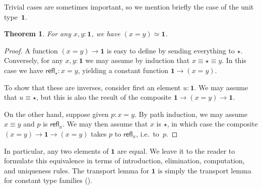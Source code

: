 \documentclass[12pt]{article}
\newcommand{\eqv}[2]{\ensuremath{#1 \simeq #2}\xspace}
\newcommand{\jdeq}{\equiv}
\newcommand{\refl}[1]{\ensuremath{\mathsf{refl}_{#1}}\xspace}
\newcommand{\ttt}{\ensuremath{\star}\xspace}
\newcommand{\unit}{\ensuremath{\mathbf{1}}\xspace}
\newtheorem{thm}{Theorem}[section]
\begin{document}
%
Trivial cases are sometimes important, so we mention briefly the case of the unit type~\unit.

\begin{thm}\label{thm:path-unit}
  For any $x,y:\unit$, we have $\eqv{(x=y)}{\unit}$.
\end{thm}
\begin{proof}
  A function $(x=y)\to\unit$ is easy to define by sending everything to \ttt.
  Conversely, for any $x,y:\unit$ we may assume by induction that $x\jdeq \ttt\jdeq y$.
  In this case we have $\refl{\ttt}:x=y$, yielding a constant function $\unit\to(x=y)$.

  To show that these are inverses, consider first an element $u:\unit$.
  We may assume that $u\jdeq\ttt$, but this is also the result of the composite $\unit \to (x=y)\to\unit$.

  On the other hand, suppose given $p:x=y$.
  By path induction, we may assume $x\jdeq y$ and $p$ is $\refl x$.
  We may then assume that $x$ is \ttt, in which case the composite $(x=y) \to \unit\to(x=y)$ takes $p$ to $\refl x$, i.e.\ to~$p$.
\end{proof}

In particular, any two elements of $\unit$ are equal.
We leave it to the reader to formulate this equivalence in terms of introduction, elimination, computation, and uniqueness rules.
%
The transport lemma for \unit is simply the transport lemma for constant type families ().

%
\end{document}
